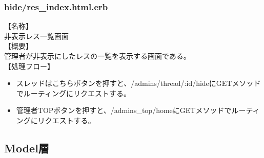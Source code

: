 \documentclass[a4j]{jarticle}
\begin{document}
\subsubsection{hide/res\_index.html.erb}
\noindent
【名称】\\
非表示レス一覧画面\\
【概要】\\
管理者が非表示にしたレスの一覧を表示する画面である。\\
【処理フロー】
\begin{itemize}
  \item スレッドはこちらボタンを押すと、/admins/thread/:id/hideにGETメソッドでルーティングにリクエストする。
  \item 管理者TOPボタンを押すと、/admins\_top/homeにGETメソッドでルーティングにリクエストする。
\end{itemize}

%

\subsection{Model層}
\end{document}
